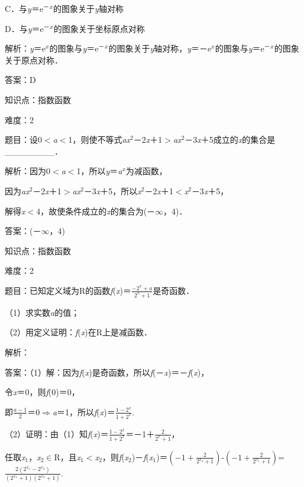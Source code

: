 \documentclass{article} %
\begin{document}
C．与\textit{y}＝e${}^{\textrm{－}}$\textit{${}^{x}$}的图象关于\textit{y}轴对称

D．与\textit{y}＝e${}^{\textrm{－}}$\textit{${}^{x}$}的图象关于坐标原点对称

解析：\textit{y}＝e\textit{${}^{x}$}的图象与\textit{y}＝e${}^{\textrm{－}}$\textit{${}^{x}$}的图象关于\textit{y}轴对称，\textit{y}＝－e\textit{${}^{x}$}的图象与\textit{y}＝e${}^{\textrm{－}}$\textit{${}^{x}$}的图象关于原点对称．

答案：D

知识点：指数函数

难度：2

题目：设0$\mathrm{<}$\textit{a}$\mathrm{<}$1，则使不等式\textit{ax}${}^{2}$－2\textit{x}＋1$\mathrm{>}$\textit{ax}${}^{2}$－3\textit{x}＋5成立的\textit{x}的集合是\_\_\_\_\_\_\_\_．

解析：因为0$\mathrm{<}$\textit{a}$\mathrm{<}$1，所以\textit{y}＝\textit{a${}^{x}$}为减函数，

因为\textit{ax}${}^{2}$－2\textit{x}＋1$\mathrm{>}$\textit{ax}${}^{2}$－3\textit{x}＋5，所以\textit{x}${}^{2}$－2\textit{x}＋1$\mathrm{<}$\textit{x}${}^{2}$－3\textit{x}＋5，

解得\textit{x}$\mathrm{<}$4，故使条件成立的\textit{x}的集合为(－$\mathrm{\infty}$，4)．

答案：(－$\mathrm{\infty}$，4)

知识点：指数函数

难度：2

题目：已知定义域为R的函数\textit{f}(\textit{x})＝$\frac{-2^{x}+a}{2^{x}+1}$是奇函数．

（1）求实数\textit{a}的值；

（2）用定义证明：\textit{f}(\textit{x})在R上是减函数．

解析：

答案：（1）解：因为\textit{f}(\textit{x})是奇函数，所以\textit{f}(－\textit{x})＝－\textit{f}(\textit{x})，

令\textit{x}＝0，则\textit{f}(0)＝0，

即$\frac{a-1}{2}$＝0$\mathrm{\Rightarrow }$\textit{a}＝1，所以\textit{f}(\textit{x})＝$\frac{1-2^{x}}{1+2^{x}}$.

（2）证明：由（1）知\textit{f}(\textit{x})＝$\frac{1-2^{x}}{1+2^{x}}$＝－1＋$\frac{2}{2^{x}+1}$，

任取\textit{x}${}_{1}$，\textit{x}${}_{2}$$\mathrm{\in}$R，且\textit{x}${}_{1}$$\mathrm{<}$\textit{x}${}_{2}$，则\textit{f}(\textit{x}${}_{2}$)－\textit{f}(\textit{x}${}_{1}$)＝$(-1+\frac{2}{2^{x_{2}}+1})$-$(-1+\frac{2}{2^{x_{1}}+1})$=$\frac{2(2^{x_{1}}-2^{x_{2}})}{(2^{x_{1}}+1)(2^{x_{2}}+1)}$.
\end{document}
